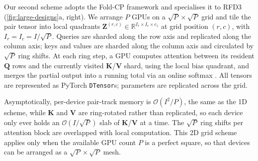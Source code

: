 Our second scheme adopts the Fold-CP framework \parencite{lin_fold-cp_2026} and
specialises it to RFD3 (\cref{fig:large-designs}a, right). We arrange $P$ GPUs on a
$\sqrt{P}\times\sqrt{P}$ grid and tile the pair tensor into local quadrants
$\mathbf{Z}^{(r,c)}\in\mathbb{R}^{I_r\times I_c\times c_z}$ at grid position
$(r,c)$, with $I_r=I_c=I/\sqrt{P}$. Queries are sharded along the row axis and
replicated along the column axis; keys and values are sharded along the column
axis and circulated by $\sqrt{P}$ ring shifts. At each
ring step, a GPU computes attention between its resident $\mathbf{Q}$ rows and the
currently visited $\mathbf{K}$/$\mathbf{V}$ shard, using the local bias quadrant,
and merges the partial output into a running total via an online softmax
\parencite{milakov_online_2018,liuRingAttentionBlockwise2023}. All tensors are represented as
PyTorch \texttt{DTensor}s; parameters are replicated across the grid.

Asymptotically, per-device pair-track memory is $\mathcal{O}(I^{2}/P)$, the same
as the 1D scheme, while $\mathbf{K}$ and $\mathbf{V}$ are ring-rotated rather than
replicated, so each device only ever holds an $\mathcal{O}(I/\sqrt{P})$ slab of
$\mathbf{K}$/$\mathbf{V}$ at a time. The $\sqrt{P}$ ring shifts per attention block
are overlapped with local computation. This 2D
grid scheme applies only when the available GPU count $P$ is a perfect square, so
that devices can be arranged as a $\sqrt{P}\times\sqrt{P}$ mesh.




